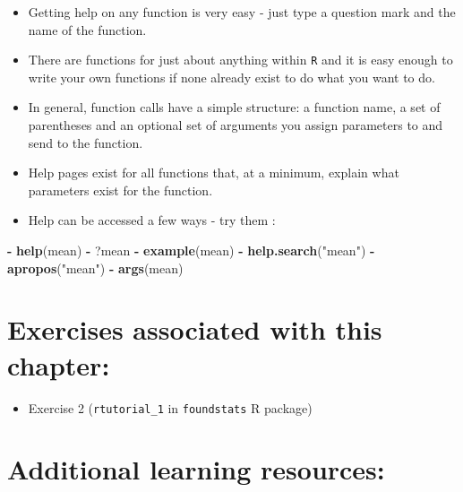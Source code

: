 \documentclass[]{book}
\newenvironment{Shaded}{\begin{snugshade}}{\end{snugshade}}
\newcommand{\KeywordTok}[1]{\textcolor[rgb]{0.13,0.29,0.53}{\textbf{#1}}}
\newcommand{\NormalTok}[1]{#1}
\newcommand{\OperatorTok}[1]{\textcolor[rgb]{0.81,0.36,0.00}{\textbf{#1}}}
\newcommand{\StringTok}[1]{\textcolor[rgb]{0.31,0.60,0.02}{#1}}
\providecommand{\tightlist}{%
  \setlength{\itemsep}{0pt}\setlength{\parskip}{0pt}}
\begin{document}
\begin{itemize}
\item
  Getting help on any function is very easy - just type a question mark and the name of the function.
\item
  There are functions for just about anything within \texttt{R} and it is easy enough to write your own functions if none already exist to do what you want to do.
\item
  In general, function calls have a simple structure: a function name, a set of parentheses and an optional set of arguments you assign parameters to and send to the function.
\item
  Help pages exist for all functions that, at a minimum, explain what parameters exist for the function.
\item
  Help can be accessed a few ways - try them :
\end{itemize}

\begin{Shaded}
\begin{Highlighting}[]
\OperatorTok{-}\StringTok{ }\KeywordTok{help}\NormalTok{(mean)}
\OperatorTok{-}\StringTok{ }\NormalTok{?mean}
\OperatorTok{-}\StringTok{ }\KeywordTok{example}\NormalTok{(mean)}
\OperatorTok{-}\StringTok{ }\KeywordTok{help.search}\NormalTok{(}\StringTok{"mean"}\NormalTok{)}
\OperatorTok{-}\StringTok{ }\KeywordTok{apropos}\NormalTok{(}\StringTok{"mean"}\NormalTok{)}
\OperatorTok{-}\StringTok{ }\KeywordTok{args}\NormalTok{(mean)}
\end{Highlighting}
\end{Shaded}

\hypertarget{exercises-associated-with-this-chapter-1}{%
\section{Exercises associated with this chapter:}\label{exercises-associated-with-this-chapter-1}}

\begin{itemize}
\tightlist
\item
  Exercise 2 (\texttt{rtutorial\_1} in \texttt{foundstats} R package)
\end{itemize}

\hypertarget{additional-learning-resources-1}{%
\section{Additional learning resources:}\label{additional-learning-resources-1}}
\end{document}
